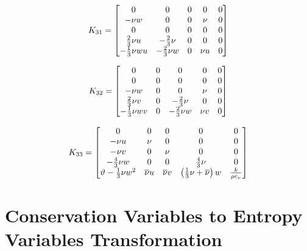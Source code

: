 \begin{equation*}
  K_{31} =
  \begin{bmatrix}
    0          & 0        & 0 & 0     & 0 \\
    -\nu w     & 0        & 0 & \nu   & 0 \\
    0          & 0        & 0 & 0     & 0 \\
    \frac{2}{3}\nu u    & -\frac{2}{3}\nu   & 0 & 0     & 0 \\ 
    -\frac{1}{3}\nu w u & -\frac{2}{3}\nu w & 0 & \nu u & 0
  \end{bmatrix}
\end{equation*}

\begin{equation*}
  K_{32} =
  \begin{bmatrix}
    0          & 0 & 0        & 0     & 0 \\
    0          & 0 & 0        & 0     & 0 \\
    -\nu w     & 0 & 0        & \nu   & 0 \\
    \frac{2}{3}\nu v    & 0 & -\frac{2}{3}\nu   & 0     & 0 \\ 
    -\frac{1}{3}\nu w v & 0 & -\frac{2}{3}\nu w & \nu v & 0
  \end{bmatrix}
\end{equation*}

\begin{equation*}
  K_{33} =
  \begin{bmatrix}
    0                     & 0        & 0        & 0                            & 0 \\
    -\nu u                & \nu      & 0        & 0                            & 0 \\
    -\nu v                & 0        & \nu      & 0                            & 0 \\
    -\frac{4}{3}\nu w              & 0        & 0        & \frac{4}{3}\nu                        & 0 \\ 
    \vartheta - \frac{1}{3}\nu w^2 & \overline{\nu} u & \overline{\nu} v & \left(\frac{1}{3}\nu + \overline{\nu}\right)w & \frac{k}{\rho c_v}
  \end{bmatrix}
\end{equation*}
\normalsize

\section{Conservation Variables to Entropy Variables Transformation\label{compressible_entropy_transformation}}



